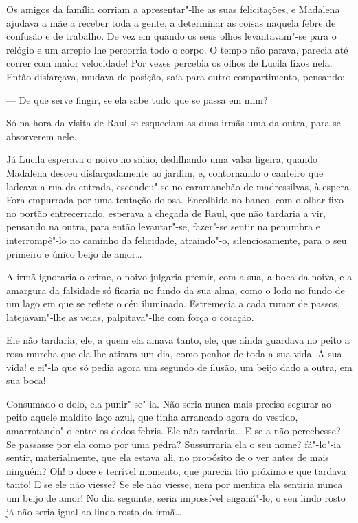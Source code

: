 Os amigos da família corriam a apresentar"-lhe as suas felicitações, e
Madalena ajudava a mãe a receber toda a gente, a determinar as coisas
naquela febre de confusão e de trabalho. De vez em quando os seus olhos
levantavam"-se para o relógio e um arrepio lhe percorria todo o corpo. O
tempo não parava, parecia até correr com maior velocidade! Por vezes
percebia os olhos de Lucila fixos nela. Então disfarçava, mudava de
posição, saía para outro compartimento, pensando:

--- De que serve fingir, se ela sabe tudo que se passa em mim?

Só na hora da visita de Raul se esqueciam as duas irmãs uma da outra,
para se absorverem nele.

\asterisc

Já Lucila esperava o noivo no salão, dedilhando uma valsa ligeira,
quando Madalena desceu disfarçadamente ao jardim, e, contornando o
canteiro que ladeava a rua da entrada, escondeu"-se no caramanchão de
madressilvas, à espera. Fora empurrada por uma tentação dolosa.
Encolhida no banco, com o olhar fixo no portão entrecerrado, esperava a
chegada de Raul, que não tardaria a vir, pensando na outra, para então
levantar"-se, fazer"-se sentir na penumbra e interrompê"-lo no caminho da
felicidade, atraindo"-o, silenciosamente, para o seu primeiro e único
beijo de amor\ldots{}

A irmã ignoraria o crime, o noivo julgaria premir, com a sua, a boca da
noiva, e a amargura da falsidade só ficaria no fundo da sua alma, como o
lodo no fundo de um lago em que se reflete o céu iluminado. Estremecia a
cada rumor de passos, latejavam"-lhe as veias, palpitava"-lhe com força o
coração.

Ele não tardaria, ele, a quem ela amava tanto, ele, que ainda guardava
no peito a rosa murcha que ela lhe atirara um dia, como penhor de toda a
sua vida. A sua vida! e ei"-la que só pedia agora um segundo de ilusão,
um beijo dado a outra, em sua boca!

Consumado o dolo, ela punir"-se"-ia. Não seria nunca mais preciso segurar
ao peito aquele maldito laço azul, que tinha arrancado agora do vestido,
amarrotando"-o entre os dedos febris. Ele não tardaria\ldots{} E se a não
percebesse? Se passasse por ela como por uma pedra? Sussurraria ela o
seu nome? fá"-lo"-ia sentir, materialmente, que ela estava ali, no
propósito de o ver antes de mais ninguém? Oh! o doce e terrível momento,
que parecia tão próximo e que tardava tanto! E se ele não viesse? Se ele
não viesse, nem por mentira ela sentiria nunca um beijo de amor! No dia
seguinte, seria impossível enganá"-lo, o seu lindo rosto já não seria
igual ao lindo rosto da irmã\ldots{}


